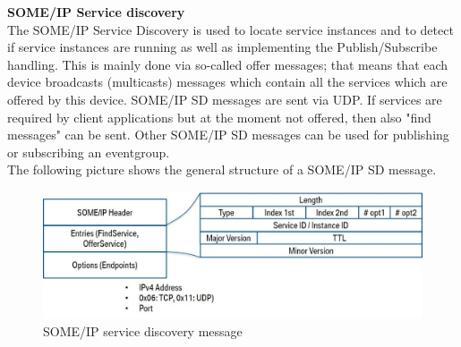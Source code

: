 \documentclass{fisattraining}
\begin{document}
\textbf{SOME/IP Service discovery}\\
The SOME/IP Service Discovery is used to locate service instances and to detect if service instances are running as well as implementing the Publish/Subscribe handling. This is mainly done via so-called offer messages; that means that each device broadcasts (multicasts) messages which contain all the services which are offered by this device. SOME/IP SD messages are sent via UDP. If services are required by client applications but at the moment not offered, then also "find messages" can be sent. Other SOME/IP SD messages can be used for publishing or subscribing an eventgroup.\\
The following picture shows the general structure of a SOME/IP SD message.
\begin{figure}[h!]
\begin{center}
\includegraphics[scale=.5]{SOMEIPServiceDiscovery}
\caption{SOME/IP service discovery message}
\end{center}
\end{figure}
\end{document}
